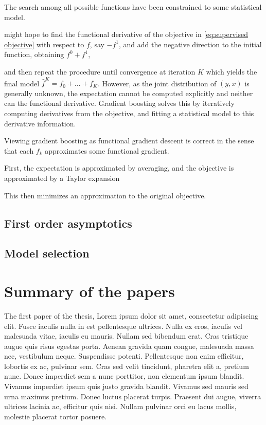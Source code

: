 The search among all possible functions have been constrained to some statistical model.


 might hope to find the functional derivative of the objective in \eqref{eq:supervised objective} with respect to $f$, say $-f^1$, and add the negative direction to the initial function, obtaining $f^0+f^1$,

 and then repeat the procedure until convergence at iteration $K$ which yields the final model $\hat{f}^K=f_0+\dots+f_K$.
However, as the joint distribution of $(y,x)$ is generally unknown, the expectation cannot be computed explicitly and neither can the functional derivative.
Gradient boosting solves this by iteratively computing derivatives from the objective, and fitting a statistical model to this derivative information.

Viewing gradient boosting as functional gradient descent is correct in the sense that each $f_k$ approximates some functional gradient.

First, the expectation is approximated by averaging, and the objective is approximated by a Taylor expansion







This then minimizes an approximation to the original objective.


\section{First order asymptotics}
\label{sec:first order asymptotics}


\section{Model selection}
\label{sec:model selection}




\chapter{Summary of the papers}

The first paper of the thesis, Lorem ipsum dolor sit amet, consectetur adipiscing elit. Fusce iaculis nulla in est pellentesque ultrices. Nulla ex eros, iaculis vel malesuada vitae, iaculis eu mauris. Nullam sed bibendum erat. Cras tristique augue quis risus egestas porta. Aenean gravida quam congue, malesuada massa nec, vestibulum neque. Suspendisse potenti. Pellentesque non enim efficitur, lobortis ex ac, pulvinar sem. Cras sed velit tincidunt, pharetra elit a, pretium nunc. Donec imperdiet sem a nunc porttitor, non elementum ipsum blandit. Vivamus imperdiet ipsum quis justo gravida blandit. Vivamus sed mauris sed urna maximus pretium. Donec luctus placerat turpis. Praesent dui augue, viverra ultrices lacinia ac, efficitur quis nisi. Nullam pulvinar orci eu lacus mollis, molestie placerat tortor posuere.


